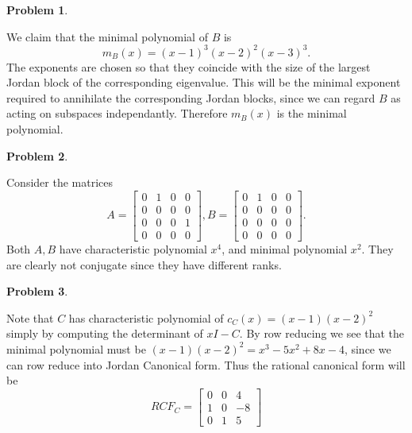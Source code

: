 \documentclass[12pt, a4paper]{article}
\newtheorem{problem}{Problem}
\theoremstyle{definition}
\newcommand{\bmat}[1]{\begin{bmatrix}#1\end{bmatrix}}
\begin{document}
\newpage 
\begin{problem}
\end{problem}
We claim that the minimal polynomial of $B$ is $$m_B(x) = (x-1)^3(x-2)^2(x-3)^3.$$ The exponents are chosen so that they coincide with the size of the largest Jordan block of the corresponding eigenvalue. This will be the minimal exponent required to annihilate the corresponding Jordan blocks, since we can regard $B$ as acting on subspaces independantly. Therefore $m_B(x)$ is the minimal polynomial.
\newpage
\begin{problem}
\end{problem} 
Consider the matrices $$A= \bmat{0&1&0&0 \\ 0&0&0&0 \\ 0&0&0&1 \\ 0&0&0&0}, B = \bmat{0&1&0&0 \\ 0&0&0&0 \\ 0&0&0&0 \\ 0&0&0&0}.$$ Both $A,B$ have characteristic polynomial $x^4$, and minimal polynomial $x^2$. They are clearly not conjugate since they have different ranks. 
\newpage 
\begin{problem}
\end{problem}
Note that $C$ has characteristic polynomial of $c_C(x) = (x-1)(x-2)^2$ simply by computing the determinant of $xI-C$. By row reducing we see that the minimal polynomial must be $(x-1)(x-2)^2 = x^3-5x^2+8x-4$, since we can row reduce into Jordan Canonical form.  Thus the rational canonical form will be $$RCF_C = \bmat{0&0&4\\ 1&0&-8\\ 0&1&5}$$
\end{document}

